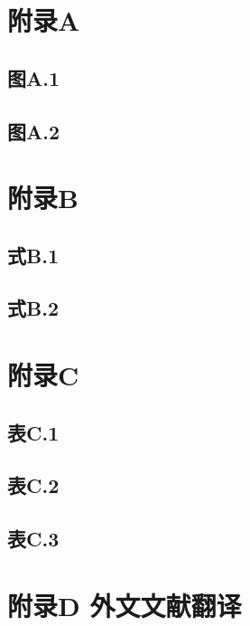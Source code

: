 \appendix
\chapter{附录A}
\section*{图A.1}

\section*{图A.2}

\chapter{附录B}
\section*{式B.1}

\section*{式B.2}

\chapter{附录C}
\section*{表C.1}

\section*{表C.2}

\section*{表C.3}

\chapter{附录D 外文文献翻译}
